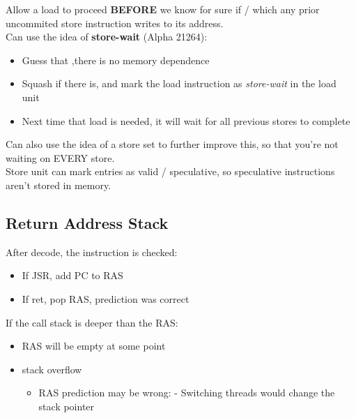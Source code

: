 \documentclass[a4paper, 5pt, twocolumn]{article}
\begin{document}
Allow a load to proceed \textbf{BEFORE} we know for sure if / which any
prior uncommited store instruction writes to its address. \\

Can use the idea of \textbf{store-wait} (Alpha 21264): 
\begin{itemize}[topsep=0pt,itemsep=-1ex,partopsep=1ex,parsep=1ex]
	\item Guess that ,there is no memory dependence 
	\item Squash if there is, and mark the load instruction as \emph{store-wait} in the load unit 
	\item Next time that load is needed, it will wait for all previous stores to complete \\
\end{itemize}

Can also use the idea of a store set to further improve this, so that
you're not waiting on EVERY store. \\

Store unit can mark entries as valid / speculative, so speculative
instructions aren't stored in memory. \\

\hypertarget{return-address-stack}{%
\subsection{Return Address Stack}\label{return-address-stack}}

After decode, the instruction is checked:
\begin{itemize}[topsep=0pt,itemsep=-1ex,partopsep=1ex,parsep=1ex]
	 \item If JSR, add PC to RAS 
	 \item If ret, pop RAS, prediction was correct \\
\end{itemize}

If the call stack is deeper than the RAS: 
\begin{itemize}[topsep=0pt,itemsep=-1ex,partopsep=1ex,parsep=1ex]
	\item RAS will be empty at some point 
	\item stack overflow 
	\begin{itemize}[topsep=0pt,itemsep=-1ex,partopsep=1ex,parsep=1ex]
		\item RAS prediction may be wrong: - Switching threads would change the stack pointer \\
	\end{itemize}
\end{itemize}
\end{document}
